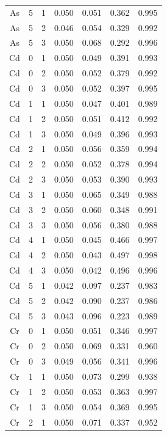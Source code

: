 \documentclass[ms, hidelinks]{uncgdissertationexp3}
\theoremstyle{plain}
\theoremstyle{definition}
\theoremstyle{remark}
\begin{document}
\begin{longtable}{ccccccc}
  As & 5 & 1 & 0.050 & 0.051 & 0.362 & 0.995\\
  \rowcolor{gray!6}  As & 5 & 2 & 0.046 & 0.054 & 0.329 & 0.992\\
  As & 5 & 3 & 0.050 & 0.068 & 0.292 & 0.996\\
  \rowcolor{gray!6}  Cd & 0 & 1 & 0.050 & 0.049 & 0.391 & 0.993\\
  Cd & 0 & 2 & 0.050 & 0.052 & 0.379 & 0.992\\
  \rowcolor{gray!6}  Cd & 0 & 3 & 0.050 & 0.052 & 0.397 & 0.995\\
  Cd & 1 & 1 & 0.050 & 0.047 & 0.401 & 0.989\\
  \rowcolor{gray!6}  Cd & 1 & 2 & 0.050 & 0.051 & 0.412 & 0.992\\
  Cd & 1 & 3 & 0.050 & 0.049 & 0.396 & 0.993\\
  \rowcolor{gray!6}  Cd & 2 & 1 & 0.050 & 0.056 & 0.359 & 0.994\\
  Cd & 2 & 2 & 0.050 & 0.052 & 0.378 & 0.994\\
  \rowcolor{gray!6}  Cd & 2 & 3 & 0.050 & 0.053 & 0.390 & 0.993\\
  Cd & 3 & 1 & 0.050 & 0.065 & 0.349 & 0.988\\
  \rowcolor{gray!6}  Cd & 3 & 2 & 0.050 & 0.060 & 0.348 & 0.991\\
  Cd & 3 & 3 & 0.050 & 0.056 & 0.380 & 0.988\\
  \rowcolor{gray!6}  Cd & 4 & 1 & 0.050 & 0.045 & 0.466 & 0.997\\
  Cd & 4 & 2 & 0.050 & 0.043 & 0.497 & 0.998\\
  \rowcolor{gray!6}  Cd & 4 & 3 & 0.050 & 0.042 & 0.496 & 0.996\\
  Cd & 5 & 1 & 0.042 & 0.097 & 0.237 & 0.983\\
  \rowcolor{gray!6}  Cd & 5 & 2 & 0.042 & 0.090 & 0.237 & 0.986\\
  Cd & 5 & 3 & 0.043 & 0.096 & 0.223 & 0.989\\
  \rowcolor{gray!6}  Cr & 0 & 1 & 0.050 & 0.051 & 0.346 & 0.997\\
  Cr & 0 & 2 & 0.050 & 0.069 & 0.331 & 0.960\\
  \rowcolor{gray!6}  Cr & 0 & 3 & 0.049 & 0.056 & 0.341 & 0.996\\
  Cr & 1 & 1 & 0.050 & 0.073 & 0.299 & 0.938\\
  \rowcolor{gray!6}  Cr & 1 & 2 & 0.050 & 0.053 & 0.363 & 0.997\\
  Cr & 1 & 3 & 0.050 & 0.054 & 0.369 & 0.995\\
  \rowcolor{gray!6}  Cr & 2 & 1 & 0.050 & 0.071 & 0.337 & 0.952\\

\end{longtable}
\end{document}
